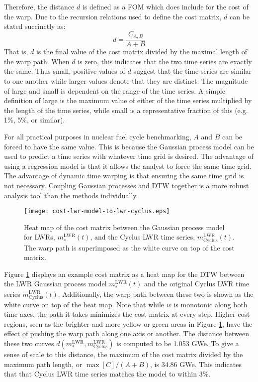 \documentclass{ntmanuscript}
\newcommand{\LWR}{\mathrm{LWR}}
\newcommand{\CYCLUS}{\mathrm{Cyclus}}
\begin{document}
Therefore, the distance $d$ is defined as a FOM which does include for the cost of the
warp.  Due to the recursion relations used to define the cost matrix, $d$ can be
stated succinctly as:
\begin{equation}
\label{d-calc}
d = \frac{C_{A,B}}{A + B}
\end{equation}
That is, $d$ is the final value of the cost matrix divided by the maximal length
of the warp path. When $d$ is zero, this indicates that the two time series
are exactly the same. Thus small, positive values of $d$ suggest that the
time series are similar to one another while larger values denote that they
are distinct. The magnitude of large and small is dependent on the range of
the time series. A simple definition of large is the maximum
value of either of the time series multiplied by the length of the time series,
while small is a representative fraction of this (e.g. 1\%, 5\%, or similar).

For all practical purposes in nuclear fuel cycle benchmarking, $A$ and $B$ can be
forced to have the same
value. This is because the Gaussian process model can be used to predict a time series
with whatever time grid is desired.  The advantage of using a regression model
is that it allows the analyst to force the same time grid.  The advantage of
dynamic time warping is that ensuring the same time grid is not necessary.
Coupling Gaussian processes and DTW together is a more robust analysis tool
than the methods individually.

\begin{figure}[htb]
\centering
\texttt{[image: cost-lwr-model-to-lwr-cyclus.eps]}
\caption{Heat map of the cost matrix between the Gaussian process model
for LWRs, $m_*^\LWR(t)$, and the Cyclus LWR time series, $m_\CYCLUS^\LWR(t)$.
The warp path is superimposed as the white curve on top of the cost matrix.}
\label{cost-lwr-model-to-lwr-cyclus}
\end{figure}

Figure \ref{cost-lwr-model-to-lwr-cyclus} displays an example cost matrix
as a heat map for the DTW between the LWR Gaussian process model
$m_*^\LWR(t)$ and the original Cyclus LWR time series $m_\CYCLUS^\LWR(t)$.
Additionally, the warp path between these two is shown as the white curve
on top of the heat map. Note that while $w$ is monotonic along both time axes, the
path it takes minimizes the cost matrix at every step. Higher cost regions,
seen as the brighter and more yellow or green areas in Figure \ref{cost-lwr-model-to-lwr-cyclus},
have the effect of pushing the warp path along one axis or another. The
distance between these two curves $d(m_*^\LWR, m_\CYCLUS^\LWR)$ is computed
to be 1.053 GWe. To give a sense of scale to this distance, the maximum of
the cost matrix divided by the
maximum path length, or $\max[C]/(A+B)$, is 34.86 GWe.  This
indicates that that Cyclus LWR time series matches the model to within 3\%.
\end{document}
